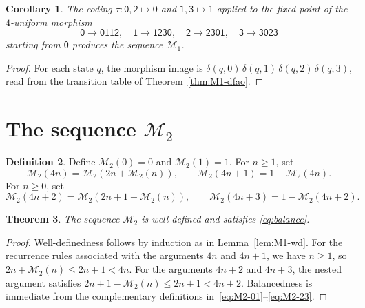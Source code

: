 \documentclass[12pt,reqno]{article}
\theoremstyle{plain}
\newtheorem{theorem}{Theorem}
\newtheorem{corollary}[theorem]{Corollary}
\theoremstyle{definition}
\newtheorem{definition}[theorem]{Definition}
\theoremstyle{remark}
\begin{document}
\begin{corollary}\label{cor:M1-morphism} 
The coding $\tau\colon \mathsf{0},\mathsf{2} \mapsto 0$ and $\mathsf{1},\mathsf{3} \mapsto 1$ applied 
 to the fixed point of the $4$-uniform morphism
\[
 \mathsf{0} \to \mathsf{0112}, \quad
 \mathsf{1} \to \mathsf{1230}, \quad
 \mathsf{2} \to \mathsf{2301}, \quad
 \mathsf{3} \to \mathsf{3023}
\]
starting from $\mathsf{0}$ produces the sequence $\mathcal{M}_{1}$.
\end{corollary}

\begin{proof}
 For each state $q$, the morphism image is $\delta(q,0)\,\delta(q,1)\,\delta(q,2)\,\delta(q,3)$, read from the 
 transition table of Theorem~\ref{thm:M1-dfao}.
\end{proof}

\section{\texorpdfstring{The sequence $\mathcal{M}_{2}$}{The sequence M2}}\label{sec:meta2} 

\begin{definition}
 Define $\mathcal{M}_{2}(0)=0$ and $\mathcal{M}_{2}(1)=1$. For $n\ge 1$, set
\begin{equation}\label{eq:M2-01} 
 \mathcal{M}_{2}(4n) = \mathcal{M}_{2}(2n+\mathcal{M}_{2}(n)),\qquad
 \mathcal{M}_{2}(4n+1) = 1-\mathcal{M}_{2}(4n).
\end{equation}
 For $n\ge 0$, set 
\begin{equation}\label{eq:M2-23} 
 \mathcal{M}_{2}(4n+2) = \mathcal{M}_{2}(2n+1-\mathcal{M}_{2}(n)),\qquad
 \mathcal{M}_{2}(4n+3) = 1-\mathcal{M}_{2}(4n+2).
\end{equation}
\end{definition}

\begin{theorem}
 The sequence $\mathcal{M}_{2}$ is well-defined and satisfies \eqref{eq:balance}.
\end{theorem}

\begin{proof}
 Well-definedness follows by induction as in Lemma~\ref{lem:M1-wd}. For the recurrence rules associated with the arguments $4n$ and 
 $4n+1$, we have $n\ge 1$, so $2n+\mathcal{M}_{2}(n)\le 2n+1<4n$. For the arguments $4n+2$ and $4n+3$, the nested 
 argument satisfies
 $2n+1-\mathcal{M}_{2}(n)\le 2n+1<4n+2$. Balancedness is immediate from the
 complementary definitions in~\eqref{eq:M2-01}--\eqref{eq:M2-23}.
\end{proof}
\end{document}
